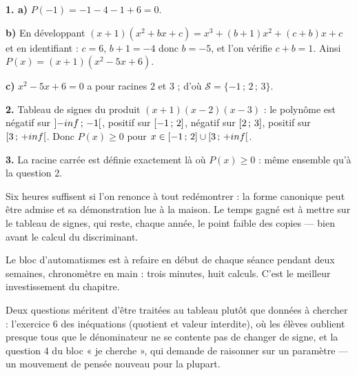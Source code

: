 \begin{corrige}
\textbf{1. a)} $P(-1) = -1-4-1+6 = 0$.

\textbf{b)} En développant $(x+1)(x^{2}+bx+c) = x^{3}+(b+1)x^{2}+(c+b)x+c$ et
en identifiant : $c = 6$, $b+1 = -4$ donc $b = -5$, et l'on vérifie
$c+b = 1$. Ainsi $P(x) = (x+1)\left(x^{2}-5x+6\right)$.

\textbf{c)} $x^{2}-5x+6 = 0$ a pour racines $2$ et $3$ ; d'où
$\mathcal S = \{-1\,;\,2\,;\,3\}$.

\textbf{2.} Tableau de signes du produit $(x+1)(x-2)(x-3)$ : le polynôme est
négatif sur $\left]-inf\,;\,-1\right[$, positif sur $\left[-1\,;\,2\right]$,
négatif sur $\left[2\,;\,3\right]$, positif sur
$\left[3\,;\,+inf\right[$. Donc
$P(x) \geq 0$ pour
$x \in \left[-1\,;\,2\right]\cup\left[3\,;\,+inf\right[$.

\textbf{3.} La racine carrée est définie exactement là où $P(x) \geq 0$ :
même ensemble qu'à la question 2.
\end{corrige}

\begin{notepourlaclasse}
Six heures suffisent si l'on renonce à tout redémontrer : la forme canonique
peut être admise et sa démonstration lue à la maison. Le temps gagné est à
mettre sur le tableau de signes, qui reste, chaque année, le point faible des
copies — bien avant le calcul du discriminant.

Le bloc d'automatismes est à refaire en début de chaque séance pendant deux
semaines, chronomètre en main : trois minutes, huit calculs. C'est le
meilleur investissement du chapitre.

Deux questions méritent d'être traitées au tableau plutôt que données à
chercher : l'exercice 6 des inéquations (quotient et valeur interdite), où
les élèves oublient presque tous que le dénominateur ne se contente pas de
changer de signe, et la question 4 du bloc « je cherche », qui demande de
raisonner sur un paramètre — un mouvement de pensée nouveau pour la plupart.
\end{notepourlaclasse}

